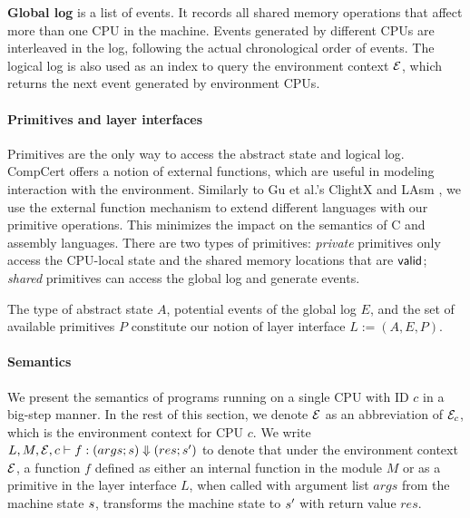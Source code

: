{\textbf{Global log} 
is a list of events. It records all shared memory operations that affect more than
one CPU in the machine. Events generated by different CPUs are
interleaved in the log, following the actual chronological order of events.
The logical log is also used as an index to query the environment context
$\mathcal{E}$, which returns the next event  generated by 
environment CPUs.


\paragraph{Primitives and layer interfaces}
Primitives are the only way to access the abstract state and
logical log. CompCert offers a notion of external
functions, which are useful in modeling interaction with the environment.
Similarly to Gu et al.'s ClightX and LAsm \cite[\S 4, \S 5]{dscal15}, we use the external function mechanism to extend different languages with our primitive operations. This minimizes the impact on the semantics of C and assembly languages.
There are two types of primitives:
\emph{private} primitives only access the CPU-local state
and the shared memory locations that are $\mathsf{valid}$;
\emph{shared} primitives can access the global log
and generate events.


The type of abstract state $A$, potential events of the global log
$E$,
and the set of available primitives $P$ constitute our notion of layer
interface $L := (A, E, P)$.

\paragraph{Semantics}
We present the semantics of programs running on a single CPU with ID $c$ in
a big-step manner.
In the rest of this section,
we denote $\mathcal{E}$ as an abbreviation
of $\mathcal{E}_c$, which is the environment context
for CPU $c$.
We write $ L, M, \mathcal{E}, c \vdash f : (args;s) \Downarrow (res;s')$ to denote
that under the environment context $\mathcal{E}$, a function $f$ defined as either
an internal function in the module $M$ or as a primitive in the layer interface $L$,
when called with argument list $args$ from the machine state $s$, transforms
the machine state to $s'$ with return value ${res}$.

}
